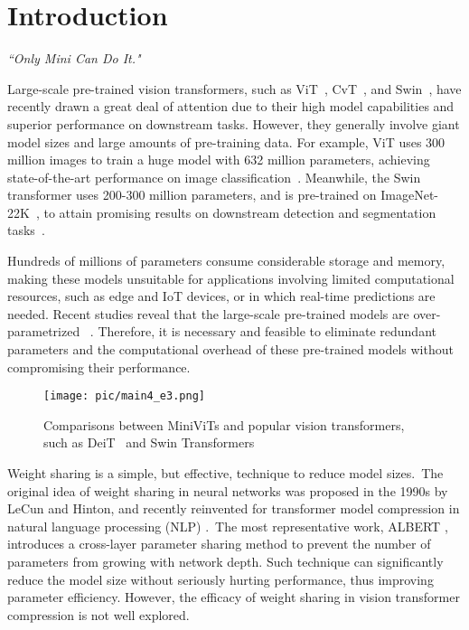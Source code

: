 \documentclass[10pt,twocolumn,letterpaper]{article}
\begin{document}
\vspace{-3mm}
    \section{Introduction}
    \label{sec:intro}
    
\textit{``Only Mini Can Do It."}


Large-scale pre-trained vision transformers, such as ViT~\cite{ViT}, CvT~\cite{MicrosoftCvT}, and Swin~\cite{Swin}, have recently drawn a great deal of attention due to their high model capabilities and superior performance on downstream tasks. However, they generally involve giant model sizes and large amounts of pre-training data. For example, ViT uses 300 million images to train a huge model with 632 million parameters, achieving state-of-the-art performance on image classification~\cite{ViT}. Meanwhile, the Swin transformer uses 200-300 million parameters, and is pre-trained on ImageNet-22K~\cite{imagenet}, to attain promising results on downstream detection and segmentation tasks~\cite{Swin}.

Hundreds of millions of parameters consume considerable storage and memory, making these models unsuitable for applications involving limited computational resources, such as edge and IoT devices, or in which real-time predictions are needed. Recent studies reveal that the large-scale pre-trained models are over-parametrized~\cite{kovaleva2019revealing} 
. Therefore, it is necessary and feasible to eliminate redundant parameters and the computational overhead of these pre-trained models without compromising their performance.

 
    \begin{figure}[t]
       \vspace{-0.5cm}
        \hspace{-0.3cm}
        \texttt{[image: pic/main4\_e3.png]}
       \vspace{-1.0cm}
        \caption{Comparisons between MiniViTs and popular vision transformers, such as DeiT~\cite{deit} and Swin Transformers~\cite{Swin}} 
        \vspace{-6mm}
    
        \label{fig:acc_params}
    \end{figure}
    

Weight sharing is a simple, but effective, technique to reduce model sizes.~The original idea of weight sharing in neural networks was proposed in the 1990s by LeCun and Hinton\cite{ws_lecun, ws_hinton}, and recently reinvented for transformer model compression in natural language processing (NLP) \cite{Albert}.~The most representative work, ALBERT \cite{Albert}, introduces a cross-layer parameter sharing method to prevent the number of parameters from growing with network depth. Such technique can significantly reduce the model size without seriously hurting performance, thus improving parameter efficiency. However, the efficacy of weight sharing in vision transformer compression is not well explored. 
\end{document}
